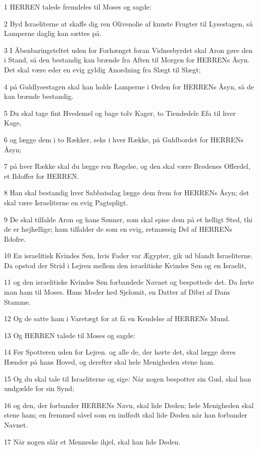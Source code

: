 \par 1 HERREN talede fremdeles til Moses og sagde:
\par 2 Byd Israeliterne at skaffe dig ren Olivenolie af knuste Frugter til Lysestagen, så Lamperne daglig kan sættes på.
\par 3 I Åbenbaringsteltet uden for Forhænget foran Vidnesbyrdet skal Aron gøre den i Stand, så den bestandig kan brænde fra Aften til Morgen for HERRENs Åsyn. Det skal være eder en evig gyldig Anordning fra Slægt til Slægt;
\par 4 på Guldlysestagen skal han holde Lamperne i Orden for HERRENs Åsyn, så de kan brænde bestandig.
\par 5 Du skal tage fint Hvedemel og bage tolv Kager, to Tiendedele Efa til hver Kage,
\par 6 og lægge dem i to Rækker, seks i hver Række, på Guldbordet for HERRENs Åsyn;
\par 7 på hver Række skal du lægge ren Røgelse, og den skal være Brødenes Offerdel, et Ildoffer for HERREN.
\par 8 Han skal bestandig hver Sabbatsdag lægge dem frem for HERRENs Åsyn; det skal være Israeliterne en evig Pagtspligt.
\par 9 De skal tilfalde Aron og hans Sønner, som skal spise dem på et helligt Sted, thi de er højhellige; ham tilfalder de som en evig, retmæssig Del af HERRENs Ildofre.
\par 10 En israelitisk Kvindes Søn, hvis Fader var Ægypter, gik ud blandt Israeliterne. Da opstod der Strid i Lejren mellem den israelitiske Kvindes Søn og en Israelit,
\par 11 og den israelitiske Kvindes Søn forbandede Navnet og bespottede det. Da førte man ham til Moses. Hans Moder hed Sjelomit, en Datter af Dibri af Dans Stamme.
\par 12 Og de satte ham i Varetægt for at få en Kendelse af HERRENs Mund.
\par 13 Og HERREN talede til Moses og sagde:
\par 14 Før Spotteren uden for Lejren. og alle de, der hørte det, skal lægge deres Hænder på hans Hoved, og derefter skal hele Menigheden stene ham.
\par 15 Og du skal tale til Israeliterne og sige: Når nogen bespotter sin Gud, skal han undgælde for sin Synd;
\par 16 og den, der forbander HERRENs Navn, skal lide Døden; hele Menigheden skal stene ham; en fremmed såvel som en indfødt skal lide Døden når han forbander Navnet.
\par 17 Når nogen slår et Menneske ihjel, skal han lide Døden.
